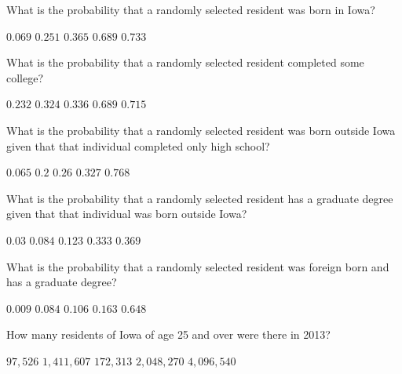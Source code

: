 \documentclass[12pt]{exam}
\begin{document}
\begin{questions}

\question\label{FirstIowa} What is the probability that a randomly selected
resident was born in Iowa?\\
\begin{oneparchoices}
\choice $0.069$ %
\choice $0.251$ %
\choice $0.365$ %
\correctchoice $0.689$
\choice $0.733$ %
\end{oneparchoices}

\question What is the probability that a randomly selected
resident completed some college?\\
\begin{oneparchoices}
\choice $0.232$ %
\correctchoice $0.324$
\choice $0.336$ %
\choice $0.689$ %
\choice $0.715$ %
\end{oneparchoices}

\question What is the probability that a randomly selected
resident was born outside Iowa given that
that individual completed only high school?\\
\begin{oneparchoices}
\choice $0.065$ %
\correctchoice $0.2$
\choice $0.26$ %
\choice $0.327$ %
\choice $0.768$ %
\end{oneparchoices}

\question What is the probability that a randomly selected
resident has a graduate degree given that
that individual was born outside Iowa?\\
\begin{oneparchoices}
\choice $0.03$ %
\choice $0.084$ %
\correctchoice $0.123$
\choice $0.333$ %
\choice $0.369$ %
\end{oneparchoices}

\question What is the probability that a randomly selected
resident was foreign born and has a graduate degree?\\
\begin{oneparchoices}
\correctchoice $0.009$
\choice $0.084$ %
\choice $0.106$ %
\choice $0.163$ %
\choice $0.648$ %
\end{oneparchoices}

\question\label{LastIowa} How many residents of Iowa 
of age 25 and over were there in 2013?\\
\begin{oneparchoices}
\choice $97,526$
\choice $1,411,607$
\choice $172,313$
\correctchoice $2,048,270$
\choice $4,096,540$ %
\end{oneparchoices}


\end{questions}
\end{document}
